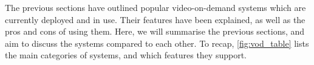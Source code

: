 
%
%


    The previous sections have outlined popular video-on-demand systems which are currently deployed and in use. Their features have been explained, as well as the pros and cons of using them. Here, we will summarise the previous sections, and aim to discuss the systems compared to each other. To recap, \autoref{fig:vod_table} lists the main categories of systems, and which features they support.

